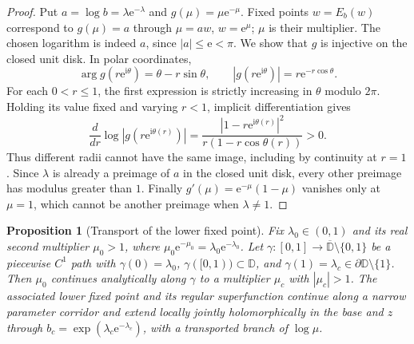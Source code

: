 \documentclass[11pt,a4paper]{article}
\newtheorem{proposition}[theorem]{Proposition}
\theoremstyle{definition}
\newcommand{\eee}{\mathrm{e}}
\newcommand{\ii}{\mathrm{i}}
\begin{document}
\begin{proof}
Put $a=\log b=\lambda\eee^{-\lambda}$ and
$g(\mu)=\mu\eee^{-\mu}$.  Fixed points $w=E_b(w)$ correspond to
$g(\mu)=a$ through $\mu=aw$, $w=\eee^\mu$; $\mu$ is their multiplier.
The chosen logarithm is indeed $a$, since $|a|\le\eee<\pi$.
We show that $g$ is injective on the closed unit disk.  In polar
coordinates,
\[
 \arg g(r\eee^{\ii\theta})=\theta-r\sin\theta,\qquad
 |g(r\eee^{\ii\theta})|=r\eee^{-r\cos\theta}.
\]
For each $0<r\le1$, the first expression is strictly increasing in
$\theta$ modulo $2\pi$.  Holding its value fixed and varying $r<1$,
implicit differentiation gives
\[
 \frac{d}{dr}\log|g(r\eee^{\ii\theta(r)})|
 =\frac{|1-r\eee^{\ii\theta(r)}|^2}
        {r(1-r\cos\theta(r))}>0.
\]
Thus different radii cannot have the same image, including by
continuity at $r=1$.  Since $\lambda$ is already a preimage of $a$ in
the closed unit disk, every other preimage has modulus greater than $1$.
Finally $g'(\mu)=\eee^{-\mu}(1-\mu)$ vanishes only at $\mu=1$,
which cannot be another preimage when $\lambda\ne1$.
\end{proof}

\begin{proposition}[Transport of the lower fixed point]
\label{prop:lower-transport}
Fix $\lambda_0\in(0,1)$ and its real second multiplier $\mu_0>1$,
where $\mu_0\eee^{-\mu_0}=\lambda_0\eee^{-\lambda_0}$.
Let $\gamma:[0,1]\to\overline{\mathbb D}\setminus\{0,1\}$ be a
piecewise $C^1$ path with $\gamma(0)=\lambda_0$,
$\gamma([0,1))\subset\mathbb D$, and
$\gamma(1)=\lambda_c\in\partial\mathbb D\setminus\{1\}$.
Then $\mu_0$ continues analytically along $\gamma$ to a multiplier
$\mu_c$ with $|\mu_c|>1$.  The associated lower fixed point and its
regular superfunction continue along a narrow parameter corridor and
extend locally jointly holomorphically in the base and $z$ through
$b_c=\exp(\lambda_c\eee^{-\lambda_c})$, with a transported branch of
$\log\mu$.
\end{proposition}
\end{document}
